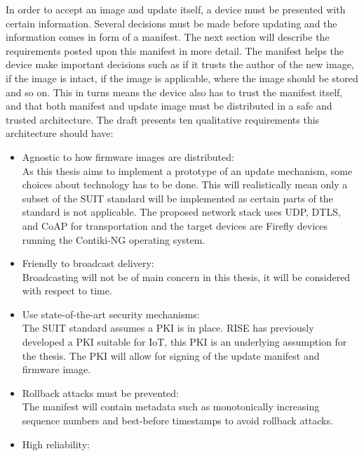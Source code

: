 \documentclass[0-thesis.tex]{subfiles}
\begin{document}
In order to accept an image and update itself, a device must be presented with certain
information. Several decisions must be made before updating and the information comes in
form of a manifest. The next section will describe the requirements posted upon this
manifest in more detail. The manifest helps the device make important decisions such
as if it trusts the author of the new image, if the image is intact, if the image is
applicable, where the image should be stored and so on. This in turns means the device
also has to trust the manifest itself, and that both manifest and update image must be
distributed in a safe and trusted architecture. The draft \parencite{suit-architecture}
presents ten qualitative requirements this architecture should have:
\begin{itemize}
    \item Agnostic to how firmware images are distributed:\\
            As this thesis aims to implement a prototype of an update mechanism, some
            choices about technology has to be done. This will realistically mean only a
            subset of the SUIT standard will be implemented as certain parts of the
            standard is not applicable. The proposed network stack uses UDP, DTLS, and
            CoAP for transportation and the target devices are Firefly devices running
            the Contiki-NG operating system.
    \item Friendly to broadcast delivery:\\
            Broadcasting will not be of main concern in this thesis, it will be considered
            with respect to time.
    \item Use state-of-the-art security mechanisms:\\
            The SUIT standard assumes a PKI is in place. RISE has previously developed a
            PKI suitable for IoT, this PKI is an underlying assumption for the thesis. The
            PKI will allow for signing of the update manifest and firmware image.
    \item Rollback attacks must be prevented:\\
            The manifest will contain metadata such as monotonically increasing sequence
            numbers and best-before timestamps to avoid rollback attacks.
    \item High reliability:\\

\end{itemize}
\end{document}
